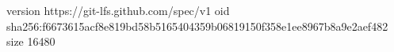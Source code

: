 version https://git-lfs.github.com/spec/v1
oid sha256:f6673615acf8e819bd58b5165404359b06819150f358e1ee8967b8a9e2aef482
size 16480
